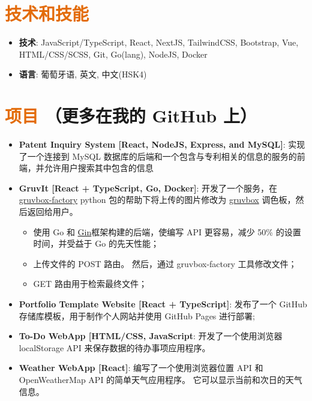\documentclass[a4paper, 20pt]{article}
\newcommand{\resumeItem}[2]{
  \item\small{
    \textbf{#1}{: #2 \vspace{-2pt}}
  }
}
\newcommand{\resumeSubItem}[2]{\resumeItem{#1}{#2}\vspace{-3pt}}
\newcommand{\resumeSubHeadingListStart}{\begin{itemize}[leftmargin=*]}
\newcommand{\resumeSubHeadingListEnd}{\end{itemize}}
\begin{document}
\begin{CJK*}{UTF8}{gbsn}
\vspace{5pt}
\section{\textcolor[HTML]{E36C09}{\textbf{技术和技能}}}
	\resumeSubHeadingListStart
	  \resumeSubItem{技术}{\quad JavaScript/TypeScript, React, NextJS, TailwindCSS, Bootstrap, Vue, HTML/CSS/SCSS, Git, Go(lang), NodeJS, Docker}
	  \resumeSubItem{语言}{\quad 葡萄牙语, 英文, 中文(HSK4)}
  \resumeSubHeadingListEnd


\vspace{5pt}
\section{\textcolor[HTML]{E36C09}{\textbf{项目}} \tiny{（更多在我的 GitHub 上）}}
  \resumeSubHeadingListStart
    \resumeSubItem{Patent Inquiry System [React, NodeJS, Express, and MySQL]}
      {实现了一个连接到 MySQL 数据库的后端和一个包含与专利相关的信息的服务的前端，并允许用户搜索其中包含的信息}
      \vspace{2pt}
      \resumeSubItem{GruvIt [React + TypeScript, Go, Docker]}
      {开发了一个服务，在 \href{https://github.com/paulopacitti/gruvbox-factory}{gruvbox-factory} python 包的帮助下将上传的图片修改为 \href{https://github.com/morhetz/gruvbox}{gruvbox} 调色板，然后返回给用户。}
      \begin{itemize}
        \item{使用 Go 和 \href{https://github.com/gin-gonic/gin}{Gin}框架构建的后端，使编写 API 更容易，减少 50\% 的设置时间，并受益于 Go 的先天性能；}
        \item{上传文件的 POST 路由。 然后，通过 gruvbox-factory 工具修改文件；}
        \item{GET 路由用于检索最终文件；}
      \end{itemize}
      \vspace{2pt}
    \resumeSubItem{Portfolio Template Website [React + TypeScript]}
      {发布了一个 GitHub 存储库模板，用于制作个人网站并使用 GitHub Pages 进行部署;}
      \vspace{2pt}
    \resumeSubItem{To-Do WebApp [HTML/CSS, JavaScript}
      {开发了一个使用浏览器 localStorage API 来保存数据的待办事项应用程序。}
      \vspace{2pt}
    \resumeSubItem{Weather WebApp [React]}
      {编写了一个使用浏览器位置 API 和 OpenWeatherMap API 的简单天气应用程序。 它可以显示当前和次日的天气信息。}
      \vspace{2pt}
  \resumeSubHeadingListEnd

\clearpage\end{CJK*}
\end{document}
